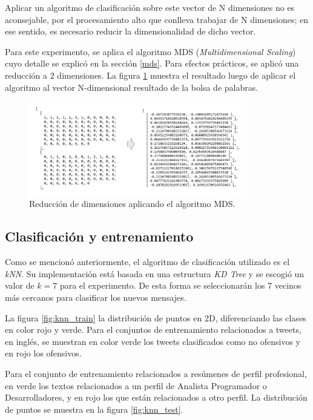Aplicar un algoritmo de clasificación sobre este vector de N dimensiones no es aconsejable, por el procesamiento alto que conlleva trabajar de N dimensiones; en ese sentido, es necesario reducir la dimensionalidad de dicho vector.

Para este experimento, se aplica el algoritmo MDS (\emph{Multidimensional Scaling}) cuyo detalle se explicó en la sección \ref{mds}. Para efectos prácticos, se aplicó una reducción a 2 dimensiones. La figura \ref{fig:mds} muestra el resultado luego de aplicar el algoritmo al vector N-dimensional resultado de la bolsa de palabras.

\begin{figure}[h!]
	\begin{center}
	\includegraphics[angle=0,width=9.5cm]{Graficos/mds}
	\caption{Reducción de dimensiones aplicando el algoritmo MDS.}
	\label{fig:mds}
  \end{center}
\end{figure}

\subsection{Clasificación y entrenamiento}

Como se mencionó anteriormente, el algoritmo de clasificación utilizado es el \emph{kNN}. Su implementación está basada en una estructura \emph{KD Tree} y se escogió un valor de $k = 7$ para el experimento. De esta forma se seleccionarán los 7 vecinos más cercanos para clasificar los nuevos mensajes.

La figura \ref{fig:knn_train} la distribución de puntos en 2D, diferenciando las clases en color rojo y verde. Para el conjuntos de entrenamiento relacionados a tweets, en inglés, se muestran en color verde los tweets clasificados como no ofensivos y en rojo los ofensivos. 

Para el conjunto de entrenamiento relacionados a resúmenes de perfil profesional, en verde los textos relacionados a un perfil de Analista Programador o Desarrolladores, y en rojo los que están relacionados a otro perfil. La distribución de puntos se muestra en la figura \ref{fig:knn_test}. 

